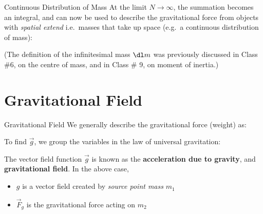 \documentclass[12pt,compress,aspectratio=169]{beamer}
\begin{document}
\begin{frame}{Continuous Distribution of Mass}
  At the limit $N\rightarrow\infty$, the summation becomes an integral, and can
  now be used to describe the gravitational force from objects with
  \emph{spatial extend} i.e.\ masses that take up space (e.g.\ a continuous
  distribution of mass):


  (The definition of the infinitesimal mass $\dl m$ was previously discussed in
  Class \#6, on the centre of mass, and in Class \# 9, on moment of inertia.)
\end{frame}



\section{Gravitational Field}

\begin{frame}{Gravitational Field}
  We generally describe the gravitational force (weight) as:
  

  To find $\vec g$, we group the variables in the law of universal gravitation:
    

  The vector field function $\vec g$ is known as the \textbf{acceleration due
    to gravity}, and \textbf{gravitational field}. In the above case,
  \begin{itemize}
  \item $g$ is a vector field created by \emph{source point mass} $m_1$
  \item $\vec F_g$ is the gravitational force acting on $m_2$
  \end{itemize}
\end{frame}
\end{document}

